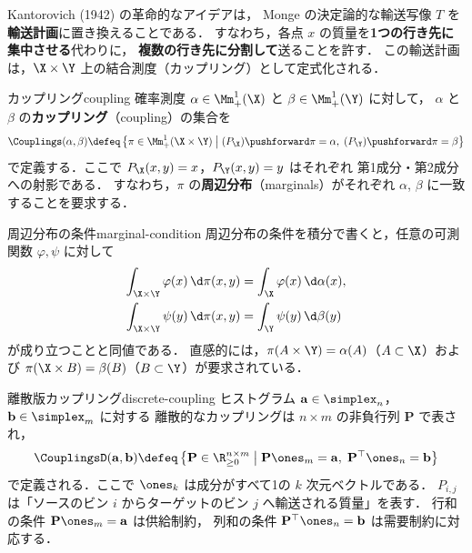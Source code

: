 Kantorovich (1942) の革命的なアイデアは，
Monge の決定論的な輸送写像 $T$ を\textbf{輸送計画}に置き換えることである．
すなわち，各点 $x$ の質量を\textbf{1つの行き先に集中させる}代わりに，
\textbf{複数の行き先に分割して}送ることを許す．
この輸送計画は，$\X \times \Y$ 上の結合測度（カップリング）として定式化される．

\begin{definition}{カップリング}{coupling}
  確率測度 $\alpha \in \Mm_+^1(\X)$ と $\beta \in \Mm_+^1(\Y)$ に対して，
  $\alpha$ と $\beta$ の\textbf{カップリング}（coupling）の集合を
  \[
    \Couplings(\alpha, \beta) \defeq
    \left\{ \pi \in \Mm_+^1(\X \times \Y) \;\middle|\;
    (P_\X)\pushforward \pi = \alpha, \;
    (P_\Y)\pushforward \pi = \beta \right\}
  \]
  で定義する．ここで $P_\X(x, y) = x$，$P_\Y(x, y) = y$ はそれぞれ
  第1成分・第2成分への射影である．
  すなわち，$\pi$ の\textbf{周辺分布}（marginals）がそれぞれ $\alpha$, $\beta$ に一致することを要求する．
\end{definition}

\begin{remark}{周辺分布の条件}{marginal-condition}
  周辺分布の条件を積分で書くと，任意の可測関数 $\varphi, \psi$ に対して
  \begin{align*}
    \int_{\X \times \Y} \varphi(x) \, \d\pi(x, y) &= \int_\X \varphi(x) \, \d\alpha(x), \\
    \int_{\X \times \Y} \psi(y) \, \d\pi(x, y) &= \int_\Y \psi(y) \, \d\beta(y)
  \end{align*}
  が成り立つことと同値である．
  直感的には，$\pi(A \times \Y) = \alpha(A)$（$A \subset \X$）および
  $\pi(\X \times B) = \beta(B)$（$B \subset \Y$）が要求されている．
\end{remark}

\begin{remark}{離散版カップリング}{discrete-coupling}
  ヒストグラム $\mathbf{a} \in \simplex_n$，$\mathbf{b} \in \simplex_m$ に対する
  離散的なカップリングは $n \times m$ の非負行列 $\mathbf{P}$ で表され，
  \[
    \CouplingsD(\mathbf{a}, \mathbf{b}) \defeq
    \left\{ \mathbf{P} \in \R_{\geq 0}^{n \times m} \;\middle|\;
    \mathbf{P} \ones_m = \mathbf{a}, \;
    \mathbf{P}^\top \ones_n = \mathbf{b} \right\}
  \]
  で定義される．ここで $\ones_k$ は成分がすべて1の $k$ 次元ベクトルである．
  $P_{i,j}$ は「ソースのビン $i$ からターゲットのビン $j$ へ輸送される質量」を表す．
  行和の条件 $\mathbf{P} \ones_m = \mathbf{a}$ は供給制約，
  列和の条件 $\mathbf{P}^\top \ones_n = \mathbf{b}$ は需要制約に対応する．
\end{remark}

